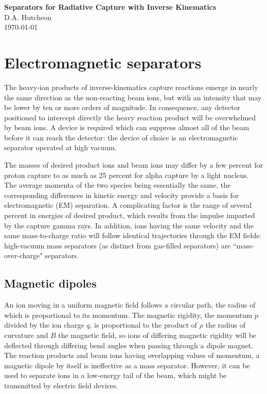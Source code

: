 \documentclass[12pt]{amsart}
\begin{document}
\begin{center}
{\Large \bf Separators for Radiative Capture with Inverse Kinematics  }\\
\vspace{0.2cm}
D.A. Hutcheon \\
\today
\end{center}

\section{Electromagnetic separators}
The heavy-ion products of  inverse-kinematics capture reactions emerge in nearly the same direction as the non-reacting beam ions, but with an intensity that may be  lower by ten or more orders of magnitude.   In consequence, any detector positioned to intercept directly the heavy reaction product will be overwhelmed by beam ions.   A device is required which can  suppress almost all of the beam before it can reach the detector: the device of choice is an electromagnetic separator operated at high vacuum.

The masses of desired product ions and beam ions may differ by a few percent for proton capture to as much as 25 percent for alpha capture by a light nucleus.   The average momenta of the two species being essentially the same, the corresponding differences in kinetic energy and velocity provide a basis for electromagnetic (EM) separation.    A complicating factor is the range  of several percent in energies of desired product,  which results from the impulse imparted by the capture gamma rays.    In addition, ions having the same velocity and the same mass-to-charge ratio will follow identical trajectories through the EM fields: high-vacuum mass separators (as distinct from gas-filled separators) are ``mass-over-charge" separators.

\subsection{Magnetic dipoles}
An ion moving in a uniform magnetic field follows a circular path, the radius of which is proportional to its  momentum.  The magnetic rigidity, the momentum $p$ divided by the ion charge $q$, is proportional to the product of $\rho$ the radius of curvature and $B$ the magnetic field, so ions of differing magnetic rigidity will be deflected through differing bend angles  when passing through a dipole magnet.  The reaction products and beam ions having overlapping values of momentum, a magnetic dipole by itself is ineffective as a mass separator.  However, it can be used to separate ions in a low-energy tail of the beam, which might be transmitted by electric field devices.
\end{document}
